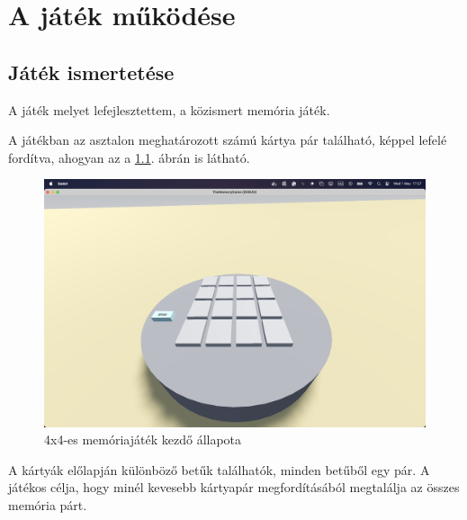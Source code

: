 \chapter{A játék működése}

\thispagestyle{fancy}
\pagestyle{fancy}
\section{Játék ismertetése}

A játék melyet lefejlesztettem, a közismert memória játék.

A játékban az asztalon meghatározott számú kártya pár található, képpel lefelé fordítva, ahogyan az a \ref{img:asztal}. ábrán is látható.
\begin{figure}[h]
    \includegraphics[width=\textwidth]{img/asztal_4x4.png}
    \caption{4x4-es memóriajáték kezdő állapota}
    \label{img:asztal}
\end{figure}
A kártyák előlapján különböző betűk találhatók, minden betűből egy pár. A játékos célja, hogy minél kevesebb kártyapár megfordításából megtalálja az összes memória párt.


